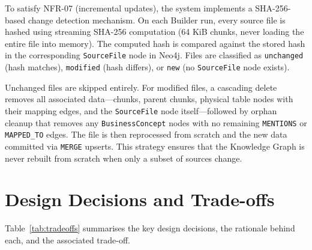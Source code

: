 To satisfy NFR-07 (incremental updates), the system implements a SHA-256-based change detection mechanism. On each Builder run, every source file is hashed using streaming SHA-256 computation (64 KiB chunks, never loading the entire file into memory). The computed hash is compared against the stored hash in the corresponding \texttt{SourceFile} node in Neo4j. Files are classified as \texttt{unchanged} (hash matches), \texttt{modified} (hash differs), or \texttt{new} (no \texttt{SourceFile} node exists).

Unchanged files are skipped entirely. For modified files, a cascading delete removes all associated data---chunks, parent chunks, physical table nodes with their mapping edges, and the \texttt{SourceFile} node itself---followed by orphan cleanup that removes any \texttt{BusinessConcept} nodes with no remaining \texttt{MENTIONS} or \texttt{MAPPED\_TO} edges. The file is then reprocessed from scratch and the new data committed via \texttt{MERGE} upserts. This strategy ensures that the Knowledge Graph is never rebuilt from scratch when only a subset of sources change.

\section{Design Decisions and Trade-offs}
\label{sec:sd:tradeoffs}

Table~\ref{tab:tradeoffs} summarises the key design decisions, the rationale behind each, and the associated trade-off.


